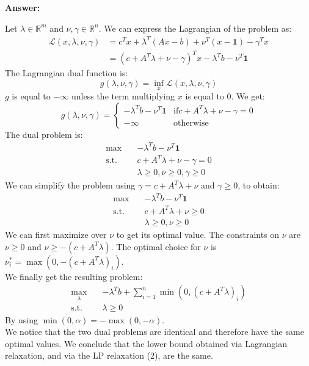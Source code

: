 \documentclass[11pt,a4paper]{article}
\newenvironment{solution}{
  \par\noindent\textbf{Answer:}\vspace{0.3em}
}{\vspace{1em}}
\begin{document}
\begin{solution}
\begin{enumerate}
        Let $\lambda \in \mathbb{R}^m$ and $\nu, \gamma \in \mathbb{R}^n$. We can express the Lagrangian of the problem as: $$\begin{aligned}
            \mathcal{L}(x, \lambda, \nu, \gamma)
            &= c^T x + \lambda^T(Ax - b) + \nu^T(x - \mathbf{1}) - \gamma^T x\\
            &= (c + A^T \lambda + \nu - \gamma)^T x - \lambda^T b - \nu^T \mathbf{1}
        \end{aligned}$$
        The Lagrangian dual function is: $$g(\lambda, \nu, \gamma) = \inf_x \mathcal{L}(x, \lambda, \nu, \gamma)$$
        $g$ is equal to $-\infty$ unless the term multiplying $x$ is equal to $0$. We get: $$g(\lambda, \nu, \gamma) = \begin{cases}
            - \lambda^T b - \nu^T \mathbf{1} &\text{if} c + A^T \lambda + \nu - \gamma = 0\\
            -\infty &\text{otherwise}
        \end{cases}$$
        The dual problem is: $$\begin{aligned}
            \max \quad & - \lambda^T b - \nu^T \mathbf{1}\\
            \text{s.t.} \quad & c + A^T \lambda + \nu - \gamma = 0\\
            & \lambda \geq 0, \nu \geq 0, \gamma \geq 0
        \end{aligned}$$
        We can simplify the problem using $\gamma = c + A^T \lambda + \nu$ and $\gamma \geq 0$, to obtain: $$\begin{aligned}
            \max \quad & - \lambda^T b - \nu^T \mathbf{1}\\
            \text{s.t.} \quad & c + A^T \lambda + \nu \geq 0\\
            & \lambda \geq 0, \nu \geq 0
        \end{aligned}$$
        We can first maximize over $\nu$ to get its optimal value. The constraints on $\nu$ are $\nu \geq 0$ and $\nu \geq - (c + A^T \lambda)$. The optimal choice for $\nu$ is $\nu_i^* = \max(0, -(c + A^T \lambda)_i)$.\\
        We finally get the resulting problem: $$\begin{aligned}
            \max_{\lambda} \quad & -\lambda^T b + \sum_{i=1}^n \min (0, (c + A^T \lambda)_i)\\
            \text{s.t.} \quad & \lambda \geq 0
        \end{aligned}$$
        By using $\min(0, \alpha) = -\max(0, -\alpha)$.\\
        We notice that the two dual problems are identical and therefore have the same optimal values. We conclude that the lower bound obtained via Lagrangian relaxation, and via the LP relaxation (2), are the same.
    \end{enumerate}
\end{solution}
\end{document}
